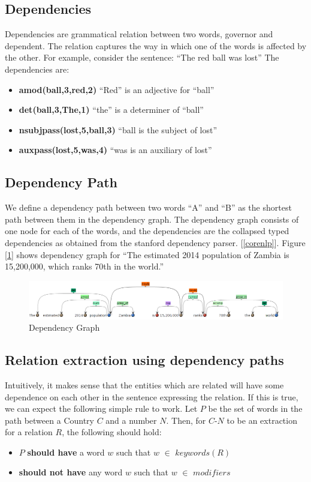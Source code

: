 \documentclass[a4paper,10pt]{article}
\begin{document}
\subsection{Dependencies}
Dependencies are grammatical relation between two words, governor and dependent.
The relation captures the way in which one of the words is affected by the other.
For example, consider the sentence:
``The red ball was lost''
The dependencies are:
\begin{itemize}

\item \textbf{amod(ball,3,red,2)} ``Red'' is an adjective for ``ball''
\item \textbf{det(ball,3,The,1)}  ``the'' is a determiner of ``ball''
\item \textbf{nsubjpass(lost,5,ball,3)}	``ball is the subject of lost''
\item \textbf{auxpass(lost,5,was,4)}	``was is an auxiliary of lost''
\end {itemize}

\subsection{Dependency Path}
We define a dependency path between two words ``A'' and ``B'' as the shortest path between them in the dependency graph.
The dependency graph consists of one node for each of the words, and the dependencies are the collapsed typed dependencies 
as obtained from the stanford dependency parser. [\ref{corenlp}]. 
Figure [\ref{fig:1}] shows dependency graph for ``The estimated 2014 population of Zambia is 15,200,000, which ranks 70th in the world.''
\begin{figure}
 \centering
 \includegraphics[bb=0 0 990 149, scale = 0.4]{./dep.png}
 \caption{Dependency Graph}
 \label{fig:1}
\end{figure}


\subsection{Relation extraction using dependency paths}
Intuitively, it makes sense that the entities which are related will have some dependence on each other in the sentence 
expressing the relation. If this is true, we can expect the following simple rule to work.
Let $P$ be the set of words in the path between a Country $C$ and a number $N$. Then, for $C$-$N$ to be an extraction for a relation
$R$, the following should hold:
  \begin{itemize}
   \item $P$ \textbf{should have} a word $w$ such that $w$ $\in$ $keywords(R)$
   \item \textbf{should not have} any word $w$ such that $w$ $\in$ $modifiers$
  \end{itemize}
  
\end{document}
